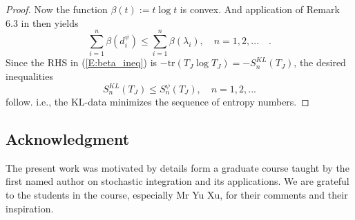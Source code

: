 \documentclass{amsart}
\theoremstyle{definition}
\theoremstyle{remark}
\numberwithin{equation}{section}
\begin{document}
\begin{proof}
Now the function $\beta(t):=t\log{t}$ is convex.  And application of Remark 6.3 in
\cite{ArKa06} then yields 
\begin{equation}
\label{E:beta_ineq}
\sum_{i=1}^{n}\beta(d_{i}^{\psi}) \leq \sum_{i=1}^{n}\beta(\lambda_{i}), 
\quad n=1,2,... \quad \text{.}
\end{equation}
Since the RHS in (\ref{E:beta_ineq}) is $-\text{tr}(T_{J}\log{T_{J}})=-S_{n}^{KL}(T_{J})$, the desired
inequalities
\begin{equation}
\label{E:S_ineq}
S_{n}^{KL}(T_{J}) \leq S_{n}^{\psi}(T_{J}), \quad n=1,2, ...
\end{equation}
follow. i.e., the KL-data minimizes the sequence of entropy numbers.
\end{proof}

\subsection*{Acknowledgment}
\label{sec:ack}
The present work was motivated by details form a graduate course taught by 
the first named author on stochastic integration and its applications. We 
are grateful to the students in the course, especially Mr Yu Xu,  for their 
comments and their inspiration.
\end{document}
